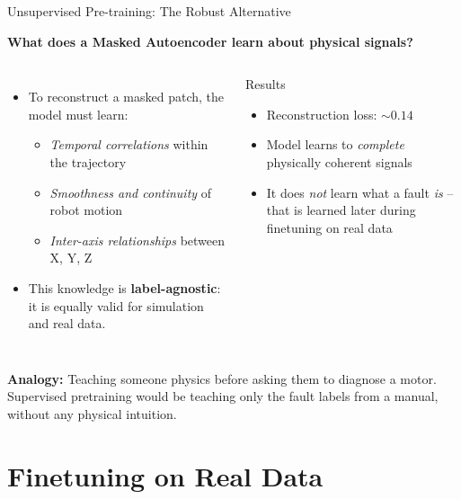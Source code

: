 \documentclass{beamer}
\begin{document}
\begin{frame}{Unsupervised Pre-training: The Robust Alternative}

    \textbf{What does a Masked Autoencoder learn about physical signals?}

    \begin{columns}
        \begin{itemize}
            \item To reconstruct a masked patch, the model must learn:
            \begin{itemize}
                \item \textit{Temporal correlations} within the trajectory
                \item \textit{Smoothness and continuity} of robot motion
                \item \textit{Inter-axis relationships} between X, Y, Z
            \end{itemize}
            \item This knowledge is \textbf{label-agnostic}: it is equally valid for simulation and real data.
        \end{itemize}

        \begin{block}{Results}
            \begin{itemize}
                \item Reconstruction loss: $\sim 0.14$
                \item Model learns to \textit{complete} physically coherent signals
                \item It does \textit{not} learn what a fault \textit{is} -- that is learned later during finetuning on real data
            \end{itemize}
        \end{block}
    \end{columns}

    \vspace{0.4cm}
    \textbf{Analogy:} Teaching someone physics before asking them to diagnose a motor. Supervised pretraining would be teaching only the fault labels from a manual, without any physical intuition.
\end{frame}

\section{Finetuning on Real Data}
\end{document}
